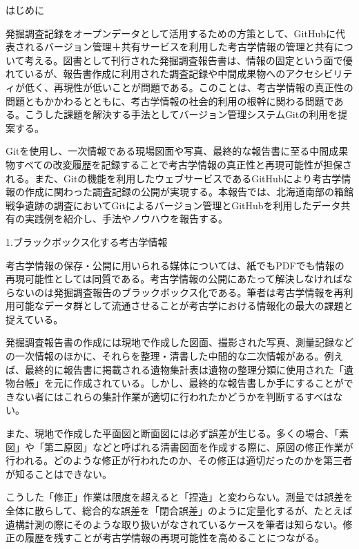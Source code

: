 \documentclass[9pt,b5j,papersize]{jsarticle}
\begin{document}
\begin{multicols}{2}

\noindent
{\large はじめに}

発掘調査記録をオープンデータとして活用するための方策として、GitHubに代表されるバージョン管理＋共有サービスを利用した考古学情報の管理と共有について考える。図書として刊行された発掘調査報告書は、情報の固定という面で優れているが、報告書作成に利用された調査記録や中間成果物へのアクセシビリティが低く、再現性が低いことが問題である。このことは、考古学情報の真正性の問題ともかかわるとともに、考古学情報の社会的利用の根幹に関わる問題である。こうした課題を解決する手法としてバージョン管理システムGitの利用を提案する。

Gitを使用し、一次情報である現場図面や写真、最終的な報告書に至る中間成果物すべての改変履歴を記録することで考古学情報の真正性と再現可能性が担保される。また、Gitの機能を利用したウェブサービスであるGitHubにより考古学情報の作成に関わった調査記録の公開が実現する。本報告では、北海道南部の箱館戦争遺跡の調査においてGitによるバージョン管理とGitHubを利用したデータ共有の実践例を紹介し、手法やノウハウを報告する。

\noindent
{\large 1.ブラックボックス化する考古学情報}

考古学情報の保存・公開に用いられる媒体については、紙でもPDFでも情報の再現可能性としては同質である。考古学情報の公開にあたって解決しなければならないのは発掘調査報告のブラックボックス化である。筆者は考古学情報を再利用可能なデータ群として流通させることが考古学における情報化の最大の課題と捉えている。

発掘調査報告書の作成には現地で作成した図面、撮影された写真、測量記録などの一次情報のほかに、それらを整理・清書した中間的な二次情報がある。例えば、最終的に報告書に掲載される遺物集計表は遺物の整理分類に使用された「遺物台帳」を元に作成されている。しかし、最終的な報告書しか手にすることができない者にはこれらの集計作業が適切に行われたかどうかを判断するすべはない。

また、現地で作成した平面図と断面図には必ず誤差が生じる。多くの場合、「素図」や「第二原図」などと呼ばれる清書図面を作成する際に、原図の修正作業が行われる。どのような修正が行われたのか、その修正は適切だったのかを第三者が知ることはできない。

こうした「修正」作業は限度を超えると「捏造」と変わらない。測量では誤差を全体に散らして、総合的な誤差を「閉合誤差」のように定量化するが、たとえば遺構計測の際にそのような取り扱いがなされているケースを筆者は知らない。修正の履歴を残すことが考古学情報の再現可能性を高めることにつながる。


\end{multicols}
\end{document}
